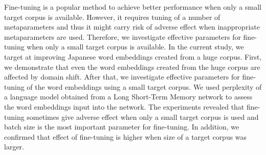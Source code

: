 Fine-tuning is a popular method to achieve better performance when only a small target corpus is available. However, it requires tuning of a number of metaparameters and thus it might carry risk of adverse effect when inappropriate metaparameters are used. Therefore, we investigate effective parameters for fine-tuning when only a small target corpus is available. In the current study, we target at improving Japanese word embeddings created from a huge corpus. First, we demonstrate that even the word embeddings created from the huge corpus are affected by domain shift. After that, we investigate effective parameters for fine-tuning of the word embeddings using a small target corpus. We used perplexity of a language model obtained from a Long Short-Term Memory network to assess the word embeddings input into the network. The experiments revealed that fine-tuning sometimes give adverse effect when only a small target corpus is used and batch size is the most important parameter for fine-tuning. In addition, we confirmed that effect of fine-tuning is higher when size of a target corpus was larger.
